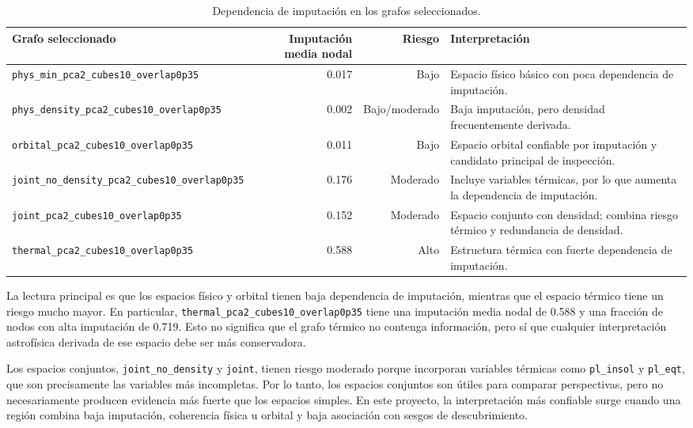 \begin{table}[H]
\centering
\small
\begin{tabular}{lrrp{}}
\toprule
\textbf{Grafo seleccionado} & \textbf{Imputación media nodal} & \textbf{Riesgo} & \textbf{Interpretación} \\
\midrule
\texttt{phys\_min\_pca2\_cubes10\_overlap0p35} & 0.017 & Bajo & Espacio físico básico con poca dependencia de imputación. \\
\texttt{phys\_density\_pca2\_cubes10\_overlap0p35} & 0.002 & Bajo/moderado & Baja imputación, pero densidad frecuentemente derivada. \\
\texttt{orbital\_pca2\_cubes10\_overlap0p35} & 0.011 & Bajo & Espacio orbital confiable por imputación y candidato principal de inspección. \\
\texttt{joint\_no\_density\_pca2\_cubes10\_overlap0p35} & 0.176 & Moderado & Incluye variables térmicas, por lo que aumenta la dependencia de imputación. \\
\texttt{joint\_pca2\_cubes10\_overlap0p35} & 0.152 & Moderado & Espacio conjunto con densidad; combina riesgo térmico y redundancia de densidad. \\
\texttt{thermal\_pca2\_cubes10\_overlap0p35} & 0.588 & Alto & Estructura térmica con fuerte dependencia de imputación. \\
\bottomrule
\end{tabular}
\caption{Dependencia de imputación en los grafos seleccionados.}
\label{tab:imputation_by_space}
\end{table}

La lectura principal es que los espacios físico y orbital tienen baja dependencia de imputación, mientras que el espacio térmico tiene un riesgo mucho mayor. En particular, \texttt{thermal\_pca2\_cubes10\_overlap0p35} tiene una imputación media nodal de 0.588 y una fracción de nodos con alta imputación de 0.719. Esto no significa que el grafo térmico no contenga información, pero sí que cualquier interpretación astrofísica derivada de ese espacio debe ser más conservadora.

Los espacios conjuntos, \texttt{joint\_no\_density} y \texttt{joint}, tienen riesgo moderado porque incorporan variables térmicas como \texttt{pl\_insol} y \texttt{pl\_eqt}, que son precisamente las variables más incompletas. Por lo tanto, los espacios conjuntos son útiles para comparar perspectivas, pero no necesariamente producen evidencia más fuerte que los espacios simples. En este proyecto, la interpretación más confiable surge cuando una región combina baja imputación, coherencia física u orbital y baja asociación con sesgos de descubrimiento.

